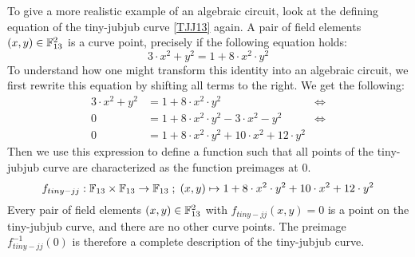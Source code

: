 \begin{example}
\label{ex:TJJ-circuit_1} To give a more realistic example of an algebraic circuit, look at the defining equation  of the tiny-jubjub curve \ref{TJJ13} again. A pair of field elements 
$(x,y)\in \mathbb{F}_{13}^2$ is a curve point, precisely if the following equation holds:
$$
3\cdot x^2 + y^2 = 1+ 8\cdot x^2\cdot y^2
$$ 
To understand how one might transform this identity into an algebraic circuit, we first rewrite this equation by shifting all terms to the right. We get the following:
\begin{align*}
3\cdot x^2 + y^2 & = 1+ 8\cdot x^2\cdot y^2 & \Leftrightarrow\\
0 & = 1+ 8\cdot x^2\cdot y^2 - 3\cdot x^2 - y^2 & \Leftrightarrow\\
0 & = 1+ 8\cdot x^2\cdot y^2 + 10\cdot x^2 +12\cdot y^2
\end{align*}
Then we use this expression to define a function such that all points of the tiny-jubjub curve are characterized as the function preimages at $0$.
$$
f_{tiny-jj}: \mathbb{F}_{13}\times \mathbb{F}_{13}\to \mathbb{F}_{13}\; ; \;
(x,y)\mapsto 1+ 8\cdot x^2\cdot y^2 + 10\cdot x^2 +12\cdot y^2
$$
Every pair of field elements $(x,y)\in \mathbb{F}_{13}^2$ with $f_{tiny-jj}(x,y)=0$ is a point on the tiny-jubjub curve, and there are no other curve points. The preimage $f_{tiny-jj}^{-1}(0)$ is therefore a complete description of the tiny-jubjub curve.


\end{example}
